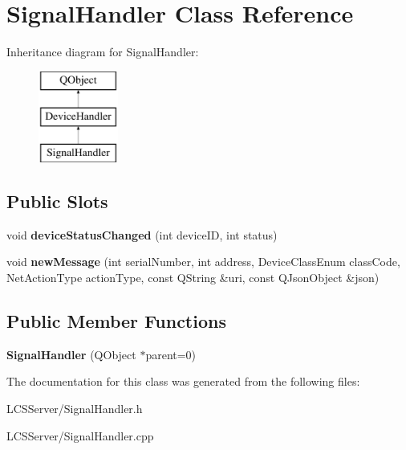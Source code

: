 \hypertarget{class_signal_handler}{}\section{Signal\+Handler Class Reference}
\label{class_signal_handler}
Inheritance diagram for Signal\+Handler\+:\begin{figure}[H]
\begin{center}
\leavevmode
\includegraphics[height=3.000000cm]{class_signal_handler}
\end{center}
\end{figure}
\subsection*{Public Slots}
\begin{DoxyCompactItemize}
\item 
\mbox{\label{class_signal_handler_acf3c282b0552de44c22bcfe917ce7ee8}} 
void {\bfseries device\+Status\+Changed} (int device\+ID, int status)
\item 
\mbox{\label{class_signal_handler_aa2bf547249bde7019c82df62dfedf7dc}} 
void {\bfseries new\+Message} (int serial\+Number, int address, Device\+Class\+Enum class\+Code, Net\+Action\+Type action\+Type, const Q\+String \&uri, const Q\+Json\+Object \&json)
\end{DoxyCompactItemize}
\subsection*{Public Member Functions}
\begin{DoxyCompactItemize}
\item 
\mbox{\label{class_signal_handler_ae12a2e068be74d669d3a5678896d4b42}} 
{\bfseries Signal\+Handler} (Q\+Object $\ast$parent=0)
\end{DoxyCompactItemize}


The documentation for this class was generated from the following files\+:\begin{DoxyCompactItemize}
\item 
L\+C\+S\+Server/Signal\+Handler.\+h\item 
L\+C\+S\+Server/Signal\+Handler.\+cpp\end{DoxyCompactItemize}
